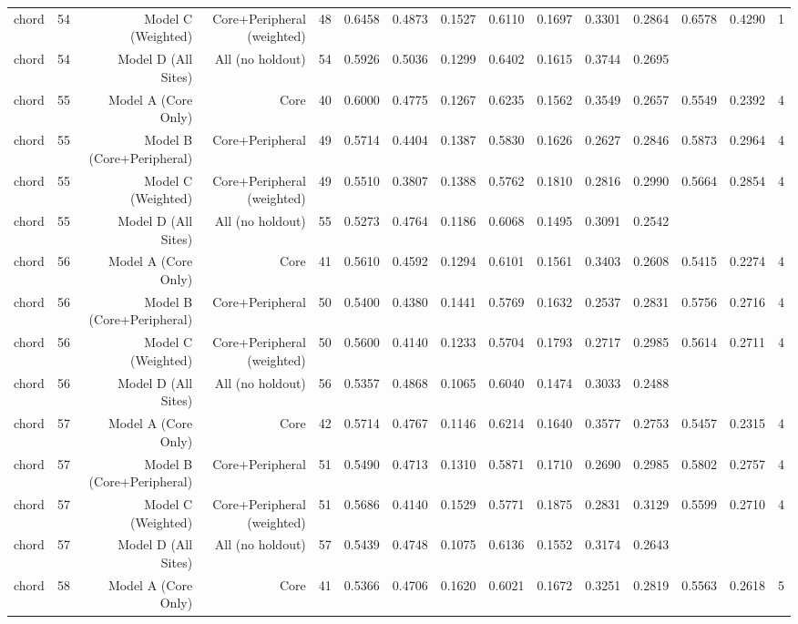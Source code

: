 {\begin{longtable}{lrrrrrrrrrrrrrr}
  chord & 54 & Model C (Weighted) & Core+Peripheral (weighted) & 48 & 0.6458 & 0.4873 & 0.1527 & 0.6110 & 0.1697 & 0.3301 & 0.2864 & 0.6578 & 0.4290 & 1 \\
  chord & 54 & Model D (All Sites) & All (no holdout) & 54 & 0.5926 & 0.5036 & 0.1299 & 0.6402 & 0.1615 & 0.3744 & 0.2695 &  &  &  \\
  chord & 55 & Model A (Core Only) & Core & 40 & 0.6000 & 0.4775 & 0.1267 & 0.6235 & 0.1562 & 0.3549 & 0.2657 & 0.5549 & 0.2392 & 4 \\
  chord & 55 & Model B (Core+Peripheral) & Core+Peripheral & 49 & 0.5714 & 0.4404 & 0.1387 & 0.5830 & 0.1626 & 0.2627 & 0.2846 & 0.5873 & 0.2964 & 4 \\
  chord & 55 & Model C (Weighted) & Core+Peripheral (weighted) & 49 & 0.5510 & 0.3807 & 0.1388 & 0.5762 & 0.1810 & 0.2816 & 0.2990 & 0.5664 & 0.2854 & 4 \\
  chord & 55 & Model D (All Sites) & All (no holdout) & 55 & 0.5273 & 0.4764 & 0.1186 & 0.6068 & 0.1495 & 0.3091 & 0.2542 &  &  &  \\
  chord & 56 & Model A (Core Only) & Core & 41 & 0.5610 & 0.4592 & 0.1294 & 0.6101 & 0.1561 & 0.3403 & 0.2608 & 0.5415 & 0.2274 & 4 \\
  chord & 56 & Model B (Core+Peripheral) & Core+Peripheral & 50 & 0.5400 & 0.4380 & 0.1441 & 0.5769 & 0.1632 & 0.2537 & 0.2831 & 0.5756 & 0.2716 & 4 \\
  chord & 56 & Model C (Weighted) & Core+Peripheral (weighted) & 50 & 0.5600 & 0.4140 & 0.1233 & 0.5704 & 0.1793 & 0.2717 & 0.2985 & 0.5614 & 0.2711 & 4 \\
  chord & 56 & Model D (All Sites) & All (no holdout) & 56 & 0.5357 & 0.4868 & 0.1065 & 0.6040 & 0.1474 & 0.3033 & 0.2488 &  &  &  \\
  chord & 57 & Model A (Core Only) & Core & 42 & 0.5714 & 0.4767 & 0.1146 & 0.6214 & 0.1640 & 0.3577 & 0.2753 & 0.5457 & 0.2315 & 4 \\
  chord & 57 & Model B (Core+Peripheral) & Core+Peripheral & 51 & 0.5490 & 0.4713 & 0.1310 & 0.5871 & 0.1710 & 0.2690 & 0.2985 & 0.5802 & 0.2757 & 4 \\
  chord & 57 & Model C (Weighted) & Core+Peripheral (weighted) & 51 & 0.5686 & 0.4140 & 0.1529 & 0.5771 & 0.1875 & 0.2831 & 0.3129 & 0.5599 & 0.2710 & 4 \\
  chord & 57 & Model D (All Sites) & All (no holdout) & 57 & 0.5439 & 0.4748 & 0.1075 & 0.6136 & 0.1552 & 0.3174 & 0.2643 &  &  &  \\
  chord & 58 & Model A (Core Only) & Core & 41 & 0.5366 & 0.4706 & 0.1620 & 0.6021 & 0.1672 & 0.3251 & 0.2819 & 0.5563 & 0.2618 & 5 \\

\end{longtable}}
